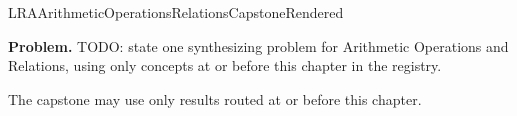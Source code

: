 \ifcsname LRAArithmeticOperationsRelationsCapstoneRendered\endcsname
\else
\expandafter\gdef\csname LRAArithmeticOperationsRelationsCapstoneRendered\endcsname{}

\newpage
{}
\label{cap:arithmetic-operations-relations}

\begin{tcolorbox}[
  colback=gray!6,
  colframe=gray!40,
  arc=2pt,
  left=8pt, right=8pt, top=6pt, bottom=6pt,
  title={\small\textbf{Capstone Problem}},
  fonttitle=\small\bfseries
]
\textbf{Problem.}
TODO: state one synthesizing problem for Arithmetic Operations and Relations,
using only concepts at or before this chapter in the registry.
\end{tcolorbox}

\begin{remark*}
The capstone may use only results routed at or before this chapter.
\end{remark*}

\clearpage
\fi
